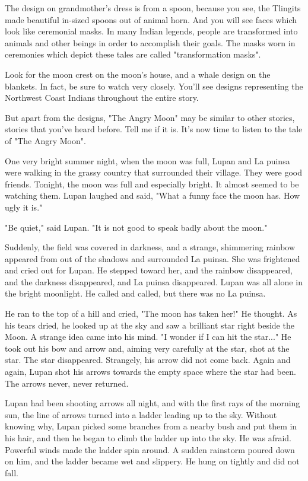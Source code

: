 The design on grandmother's dress is from a spoon, because you see, the Tlingits made beautiful in-sized spoons out of animal horn. And you will see faces which look like ceremonial masks. In many Indian legends, people are transformed into animals and other beings in order to accomplish their goals. The masks worn in ceremonies which depict these tales are called "transformation masks".

Look for the moon crest on the moon's house, and a whale design on the blankets. In fact, be sure to watch very closely. You'll see designs representing the Northwest Coast Indians throughout the entire story.

But apart from the designs, "The Angry Moon" may be similar to other stories, stories that you've heard before. Tell me if it is. It's now time to listen to the tale of "The Angry Moon".

One very bright summer night, when the moon was full, Lupan and La puinsa were walking in the grassy country that surrounded their village. They were good friends. Tonight, the moon was full and especially bright. It almost seemed to be watching them. Lupan laughed and said, "What a funny face the moon has. How ugly it is."

"Be quiet," said Lupan. "It is not good to speak badly about the moon."

Suddenly, the field was covered in darkness, and a strange, shimmering rainbow appeared from out of the shadows and surrounded La puinsa. She was frightened and cried out for Lupan. He stepped toward her, and the rainbow disappeared, and the darkness disappeared, and La puinsa disappeared. Lupan was all alone in the bright moonlight. He called and called, but there was no La puinsa.

He ran to the top of a hill and cried, "The moon has taken her!" He thought. As his tears dried, he looked up at the sky and saw a brilliant star right beside the Moon. A strange idea came into his mind. "I wonder if I can hit the star..." He took out his bow and arrow and, aiming very carefully at the star, shot at the star. The star disappeared. Strangely, his arrow did not come back. Again and again, Lupan shot his arrows towards the empty space where the star had been. The arrows never, never returned.

Lupan had been shooting arrows all night, and with the first rays of the morning sun, the line of arrows turned into a ladder leading up to the sky. Without knowing why, Lupan picked some branches from a nearby bush and put them in his hair, and then he began to climb the ladder up into the sky. He was afraid. Powerful winds made the ladder spin around. A sudden rainstorm poured down on him, and the ladder became wet and slippery. He hung on tightly and did not fall.

